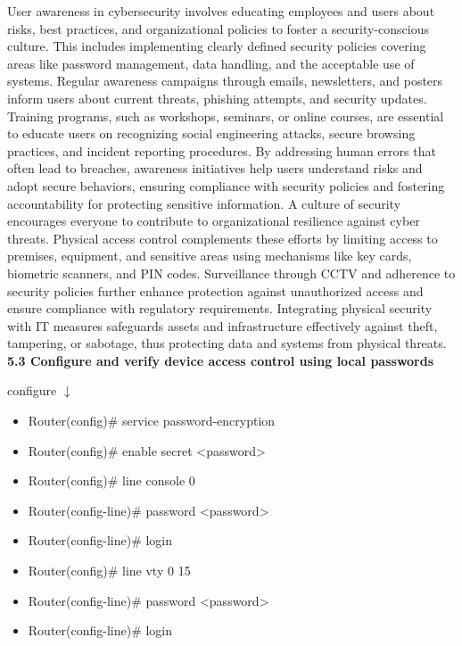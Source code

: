 \documentclass{article}
\begin{document}
	User awareness in cybersecurity involves educating employees and users about risks, best practices, and organizational policies to foster a security-conscious culture. This includes implementing clearly defined security policies covering areas like password management, data handling, and the acceptable use of systems. Regular awareness campaigns through emails, newsletters, and posters inform users about current threats, phishing attempts, and security updates. Training programs, such as workshops, seminars, or online courses, are essential to educate users on recognizing social engineering attacks, secure browsing practices, and incident reporting procedures. By addressing human errors that often lead to breaches, awareness initiatives help users understand risks and adopt secure behaviors, ensuring compliance with security policies and fostering accountability for protecting sensitive information. A culture of security encourages everyone to contribute to organizational resilience against cyber threats. Physical access control complements these efforts by limiting access to premises, equipment, and sensitive areas using mechanisms like key cards, biometric scanners, and PIN codes. Surveillance through CCTV and adherence to security policies further enhance protection against unauthorized access and ensure compliance with regulatory requirements. Integrating physical security with IT measures safeguards assets and infrastructure effectively against theft, tampering, or sabotage, thus protecting data and systems from physical threats.\\
  
\textbf{5.3 Configure and verify device access control using local passwords}

configure $\downarrow$
\begin{itemize}
\item Router(config)\# service password-encryption
\item Router(config)\# enable secret \textless password\textgreater
\item Router(config)\# line console 0
\item Router(config-line)\# password \textless password\textgreater
\item Router(config-line)\# login
\item Router(config)\# line vty 0 15
\item Router(config-line)\# password \textless password\textgreater
\item Router(config-line)\# login
\end{itemize}
		
\end{document}
